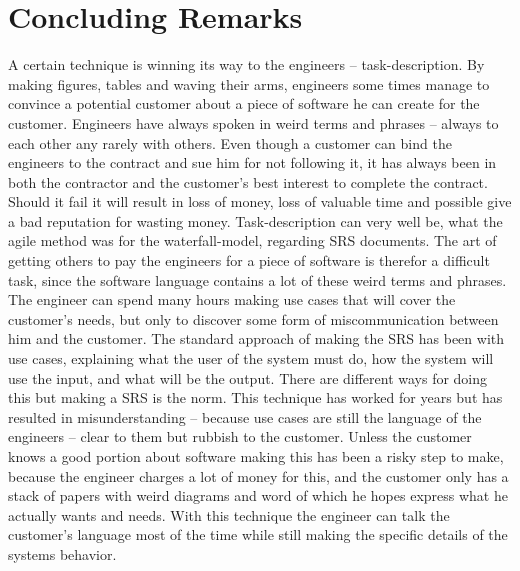 \documentclass[Main]{subfiles}
\begin{document}

\section{Concluding Remarks}
A certain technique is winning its way to the engineers -- task-description.
By making figures, tables and waving their arms, engineers some times manage to convince a potential customer about a piece of software he can create for the customer.
Engineers have always spoken in weird terms and phrases -- always to each other any rarely with others.
Even though a customer can bind the engineers to the contract and sue him for not following it, it has always been in both the contractor and the customer's best interest to complete the contract.
Should it fail it will result in loss of money, loss of valuable time and possible give a bad reputation for wasting money.
Task-description can very well be, what the agile method was for the waterfall-model, regarding SRS documents.
The art of getting others to pay the engineers for a piece of software is therefor a difficult task, since the software language contains a lot of these weird terms and phrases.
The engineer can spend many hours making use cases that will cover the customer's needs, but only to discover some form of miscommunication between him and the customer.
The standard approach of making the SRS has been with use cases, explaining what the user of the system must do, how the system will use the input, and what will be the output.
There are different ways for doing this but making a SRS is the norm.
This technique has worked for years but has resulted in misunderstanding -- because use cases are still the language of the engineers -- clear to them but rubbish to the customer.
Unless the customer knows a good portion about software making this has been a risky step to make, because the engineer charges a lot of money for this, and the customer only has a stack of papers with weird diagrams and word of which he hopes express what he actually wants and needs.
With this technique the engineer can talk the customer's language most of the time while still making the specific details of the systems behavior.
\\
\\
\end{document}
